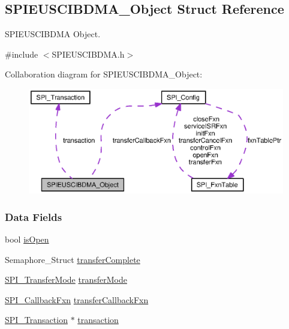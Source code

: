 \subsection{S\-P\-I\-E\-U\-S\-C\-I\-B\-D\-M\-A\-\_\-\-Object Struct Reference}
\label{struct_s_p_i_e_u_s_c_i_b_d_m_a___object}


S\-P\-I\-E\-U\-S\-C\-I\-B\-D\-M\-A Object.  




{\ttfamily \#include $<$S\-P\-I\-E\-U\-S\-C\-I\-B\-D\-M\-A.\-h$>$}



Collaboration diagram for S\-P\-I\-E\-U\-S\-C\-I\-B\-D\-M\-A\-\_\-\-Object\-:
\nopagebreak
\begin{figure}[H]
\begin{center}
\leavevmode
\includegraphics[width=350pt]{struct_s_p_i_e_u_s_c_i_b_d_m_a___object__coll__graph}
\end{center}
\end{figure}
\subsubsection*{Data Fields}
\begin{DoxyCompactItemize}
\item 
bool \hyperlink{struct_s_p_i_e_u_s_c_i_b_d_m_a___object_a00fad6593577c719027540fb731597e5}{is\-Open}
\item 
Semaphore\-\_\-\-Struct \hyperlink{struct_s_p_i_e_u_s_c_i_b_d_m_a___object_aeaff6b399015aa5eaf8c2a16b97babb9}{transfer\-Complete}
\item 
\hyperlink{_s_p_i_8h_ab9ea76c6529d6076eee5e1c4a5a92c6f}{S\-P\-I\-\_\-\-Transfer\-Mode} \hyperlink{struct_s_p_i_e_u_s_c_i_b_d_m_a___object_a0768312e5a55b8c73dcabb47b373fd88}{transfer\-Mode}
\item 
\hyperlink{_s_p_i_8h_aeb03e7608a14021c3b0acf92c90e2168}{S\-P\-I\-\_\-\-Callback\-Fxn} \hyperlink{struct_s_p_i_e_u_s_c_i_b_d_m_a___object_a1a5d8467541e90687b6c9034e45dfe75}{transfer\-Callback\-Fxn}
\item 
\hyperlink{struct_s_p_i___transaction}{S\-P\-I\-\_\-\-Transaction} $\ast$ \hyperlink{struct_s_p_i_e_u_s_c_i_b_d_m_a___object_a4b218a6096bec10cc51eeb6597ac9f8c}{transaction}
\end{DoxyCompactItemize}


